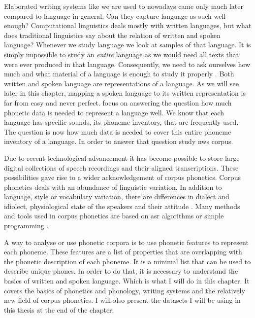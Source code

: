 \label{chap:ling-background}




Elaborated writing systems like we are used to nowadays came only much later compared to language in general. Can they capture language as such well enough? Computational linguistics deals mostly with written languages, but what does traditional linguistics say about the relation of written and spoken language? Whenever we study language we look at samples of that language. It is simply impossible to study an \textit{entire} language as we would need all texts that were ever produced in that language. Consequently, we need to ask ourselves how much and what material of a language is enough to study it properly \citep{baird_evans_greenhill_2021}. Both written and spoken language are representations of a language. As we will see later in this chapter, mapping a spoken language to its written representation is far from easy and never perfect. \citet{baird_evans_greenhill_2021} focus on answering the question how much phonetic data is needed to represent a language well. We know that each language has specific sounds, its phoneme inventory, that are frequently used. The question is now how much data is needed to cover this entire phoneme inventory of a language. In order to answer that question \citet{baird_evans_greenhill_2021} study \ac{nws} corpus. 

Due to recent technological advancement it has become possible to store large digital collections of speech recordings and their aligned transcriptions. These possibilities gave rise to a wider acknowledgement of corpus phonetics. Corpus phonetics deals with an abundance of linguistic variation. In addition to language, style or vocabulary variation, there are differences in dialect and idiolect, physiological state of the speakers and their attitude \citep{Liberman.2019, Chodroff.19.07.2019}. Many methods and tools used in corpus phonetics are based on \ac{asr} algorithms or simple programming \citep{Chodroff.19.07.2019}.

A way to analyse or use phonetic corpora is to use phonetic features to represent each phoneme. These features are a list of properties that are overlapping with the phonetic description of each phoneme. It is a minimal list that can be used to describe unique phones. In order to do that, it is necessary to understand the basics of written and spoken language. Which is what I will do in this chapter. It covers the basics of phonetics and phonology, writing systems and the relatively new field of corpus phonetics. I will also present the datasets I will be using in this thesis at the end of the chapter. 


